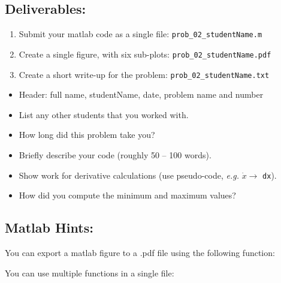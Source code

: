 \subsection*{Deliverables:}

\begin{enumerate}
  \item Submit your matlab code as a single file:  \texttt{prob\_02\_studentName.m}
  \item Create a single figure, with six sub-plots:  \texttt{prob\_02\_studentName.pdf}
  \item Create a short write-up for the problem:   \texttt{prob\_02\_studentName.txt}
\end{enumerate}

\vspace{-1.0em} \begin{itemize}  \setlength\itemsep{0em} \setlength\itemindent{18pt}
  \item Header: full name, studentName, date, problem name and number
  \item List any other students that you worked with.
  \item How long did this problem take you?
  \item Briefly describe your code (roughly 50 -- 100 words).
  \item Show work for derivative calculations (use pseudo-code, \textit{e.g.} $\dot{x} \to $ \texttt{dx}).
  \item How did you compute the minimum and maximum values?
\end{itemize}

\pagebreak

\subsection*{Matlab Hints:}

\vspace{1.0em}

You can export a matlab figure to a .pdf file using the following function:


\vspace{1.0em}

You can use multiple functions in a single file:



